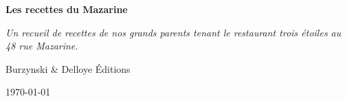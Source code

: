 \begin{titlepage}
    \centering
    
    \vspace*{4cm} %

    {\Huge\bfseries\color{black} Les recettes du Mazarine \par}
    \vspace{1cm} %
    {\Large\itshape Un recueil de recettes de nos grands parents tenant le restaurant trois étoiles au 48 rue Mazarine. \par}

    \vfill %


    \vspace{1cm}

    \vspace{1cm}
    {\large Burzynski \& Delloye Éditions \par}
    {\large \today}

\end{titlepage}